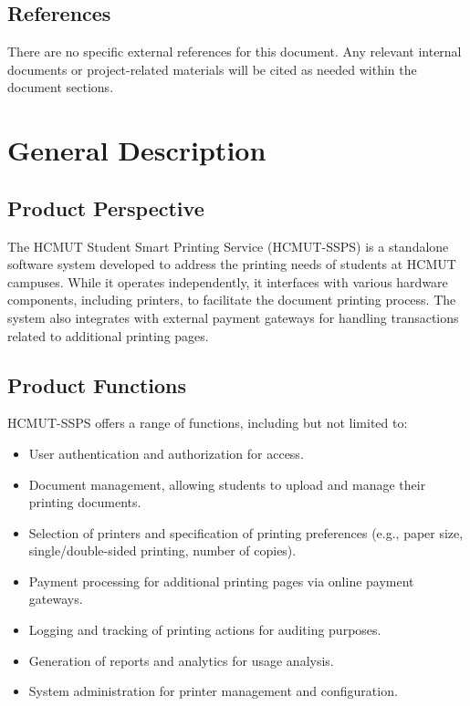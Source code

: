 \documentclass{article}
\begin{document}
\subsection{References}
There are no specific external references for this document. Any relevant internal documents or project-related materials will be cited as needed within the document sections.


\section{General Description}

\subsection{Product Perspective}
The HCMUT Student Smart Printing Service (HCMUT-SSPS) is a standalone software system developed to address the printing needs of students at HCMUT campuses. While it operates independently, it interfaces with various hardware components, including printers, to facilitate the document printing process. The system also integrates with external payment gateways for handling transactions related to additional printing pages.

\subsection{Product Functions}
HCMUT-SSPS offers a range of functions, including but not limited to:
\begin{itemize}
    \item User authentication and authorization for access.
    \item Document management, allowing students to upload and manage their printing documents.
    \item Selection of printers and specification of printing preferences (e.g., paper size, single/double-sided printing, number of copies).
    \item Payment processing for additional printing pages via online payment gateways.
    \item Logging and tracking of printing actions for auditing purposes.
    \item Generation of reports and analytics for usage analysis.
    \item System administration for printer management and configuration.
\end{itemize}
\end{document}
